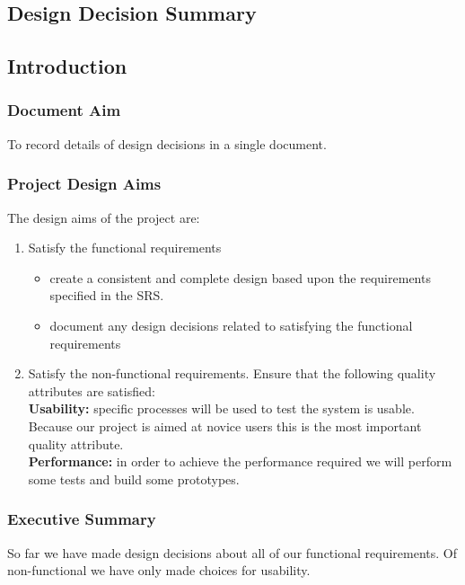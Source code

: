 \documentclass[22pt, a4paper]{article}
\begin{document}
\begin{Large}

\section{Design Decision Summary}

\subsection{Introduction}
\subsubsection{Document Aim}

To record details of design decisions in a single document.

\subsubsection{Project Design Aims}
The design aims of the project are:
\begin{enumerate}
\item Satisfy the functional requirements
	\begin{itemize}
	\item create a consistent and complete design based upon the
	requirements specified in the SRS.
	\item document any design decisions related to satisfying the
	functional requirements
	\end{itemize}
\item Satisfy the non-functional requirements.  Ensure that the following
quality attributes are satisfied: \\
{\bf Usability:} specific processes will be used to test the system is
usable.  Because our project is aimed at novice users this is the most
important quality attribute. \\
{\bf Performance:} in order to achieve the performance required we will
perform some tests and build some prototypes. \\
\end{enumerate}

\subsubsection{Executive Summary}
So far we have made design decisions about all of our functional
requirements.  Of non-functional we have only made choices for usability.


\end{Large}
\end{document}
